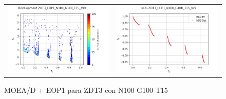 \begin{figure}[H]
\begin{tabular}{c c}
    \includegraphics[scale=0.45]{figures/ZDT3_EOP1_N100_G100_T15/s99_dev.png} &
    \includegraphics[scale=0.45]{figures/ZDT3_EOP1_N100_G100_T15/s99_nds.png}\\
    \end{tabular}
    \caption{MOEA/D + EOP1 para ZDT3 con N100 G100 T15 }
    \label{fig:2}
\end{figure}

